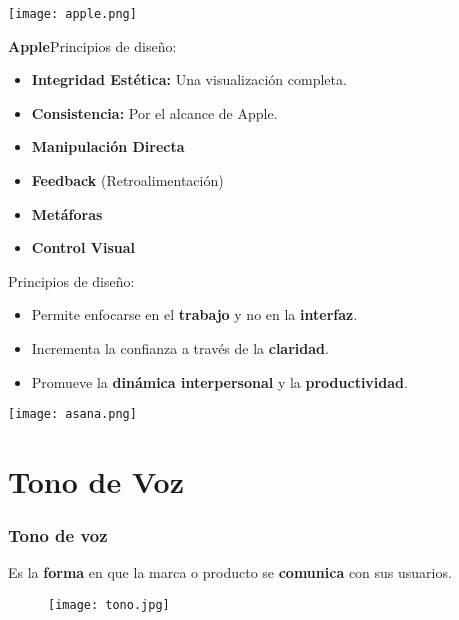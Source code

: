 \documentclass[11pt]{beamer}
\begin{document}
\begin{frame}
\begin{minipage}[c]{0.35\textwidth} 
\texttt{[image: apple.png]} 
\end{minipage}
\begin{minipage}[c]{0.60\textwidth} 
{\Large \bf Apple}\newline Principios de diseño:\addlinespace
\begin{itemize}
    \item {\bf Integridad Estética:} Una visualización completa.
    \item {\bf Consistencia:} Por el alcance de Apple.
    \item {\bf Manipulación Directa}
    \item {\bf Feedback} (Retroalimentación)
    \item {\bf Metáforas}
    \item {\bf Control Visual}
\end{itemize}
\end{minipage} 
\end{frame}

\begin{frame}
\newline Principios de diseño:\addlinespace
\begin{minipage}[c]{0.55\textwidth} 
\begin{itemize}
    \item Permite enfocarse en el \textbf{trabajo} y no en la \textbf{interfaz}.
    \item Incrementa la confianza a través de la \textbf{claridad}.
    \item Promueve la \textbf{dinámica interpersonal} y la \textbf{productividad}.
\end{itemize}
\end{minipage}
\begin{minipage}[c]{0.30\textwidth} 
\texttt{[image: asana.png]} 
\end{minipage}
\end{frame}

\section{Tono de Voz}
\begin{frame}
\frametitle{Tono de voz}
\justifying \vspace{5mm} Es la \textbf{forma} en que la marca o producto se \textbf{comunica} con sus usuarios.\newline
\begin{figure}
  \centering
  \texttt{[image: tono.jpg]} 
\end{figure}
\end{frame}
\end{document}
